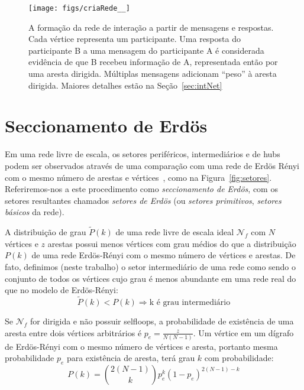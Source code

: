 \documentclass[a4paper,openright,12pt]{report} %
\begin{document}
\begin{figure}[!h]
	\centering
	\texttt{[image: figs/criaRede\_\_]}
	\caption{A formação da rede de interação a partir
		de mensagens e respostas.
		Cada vértice representa um participante.
		Uma resposta do participante B a uma
		mensagem do participante A é considerada
		evidência de que B recebeu informação de A,
		representada então por uma aresta dirigida.
		Múltiplas mensagens adicionam ``peso'' à
		aresta dirigida. Maiores detalhes
		estão na Seção~\ref{sec:intNet}}
	\label{formationNetwork}
\end{figure}

\section{Seccionamento de Erdös}\label{sec:sec}
Em uma rede livre de escala, os setores periféricos, intermediários
e de hubs podem ser observados através de uma comparação
com uma rede de Erdös Rényi com o mesmo número de arestas e vértices~\cite{3setores}, como na Figura~\ref{fig:setores}.
Referiremos-nos a este procedimento como \emph{seccionamento de Erdös},
com os setores resultantes chamados \emph{setores de Erdös} (ou \emph{setores primitivos}, \emph{setores básicos} da rede).

A distribuição de grau
$\widetilde{P}(k)$
de uma rede livre de escala ideal
$\mathcal{N}_f$ com $N$ 
vértices e $z$ arestas possui menos
vértices com grau médios do que a distribuição $P(k)$
de uma rede Erdös-Rényi com o mesmo número de vértices e arestas.
De fato, definimos (neste trabalho) o setor intermediário de uma
rede como sendo o conjunto de todos os vértices cujo grau é
menos abundante em uma rede real do que no modelo de Erdös-Rényi:
\begin{equation}\label{criterio}
	\widetilde{P}(k)<P(k) \Rightarrow \text{k é grau intermediário}
\end{equation}

Se $\mathcal{N}_f$ for dirigida e não possuir selfloops, a probabilidade
de existência de uma aresta entre dois vértices arbitrários é
$p_e=\frac{z}{N(N-1)}$.
Um vértice em um dígrafo de Erdös-Rényi com o mesmo número de vértices e aresta,
portanto mesma probabilidade
$p_e$
para existência de aresta, terá grau $k$ com probabilidade:
\begin{equation}
	P(k)=\binom{2(N-1)}{k}p_e^k(1-p_e)^{2(N-1)-k}
\end{equation}
\end{document}
